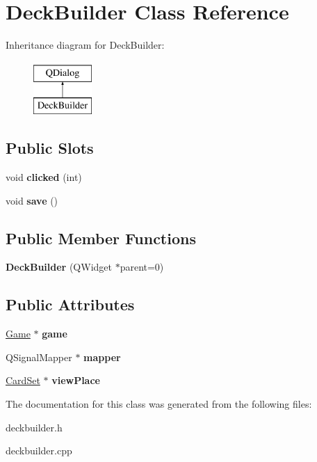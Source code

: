 \hypertarget{class_deck_builder}{}\section{Deck\+Builder Class Reference}
\label{class_deck_builder}
Inheritance diagram for Deck\+Builder\+:\begin{figure}[H]
\begin{center}
\leavevmode
\includegraphics[height=2.000000cm]{class_deck_builder}
\end{center}
\end{figure}
\subsection*{Public Slots}
\begin{DoxyCompactItemize}
\item 
\mbox{\label{class_deck_builder_a4f6b854f2e899978cfee769b60d4e383}} 
void {\bfseries clicked} (int)
\item 
\mbox{\label{class_deck_builder_a53e4027ab59c876b6c5b55be2b6abdf7}} 
void {\bfseries save} ()
\end{DoxyCompactItemize}
\subsection*{Public Member Functions}
\begin{DoxyCompactItemize}
\item 
\mbox{\label{class_deck_builder_a27ddaae932ced02f22e26444ca391909}} 
{\bfseries Deck\+Builder} (Q\+Widget $\ast$parent=0)
\end{DoxyCompactItemize}
\subsection*{Public Attributes}
\begin{DoxyCompactItemize}
\item 
\mbox{\label{class_deck_builder_ae111e9bac35ec1c2140a50a6308c55ac}} 
\hyperlink{class_game}{Game} $\ast$ {\bfseries game}
\item 
\mbox{\label{class_deck_builder_a1d73429e77634d8a4698f9a86e1b9aed}} 
Q\+Signal\+Mapper $\ast$ {\bfseries mapper}
\item 
\mbox{\label{class_deck_builder_aa7d6acc263ed5f017189614d4650e2aa}} 
\hyperlink{class_card_set}{Card\+Set} $\ast$ {\bfseries view\+Place}
\end{DoxyCompactItemize}


The documentation for this class was generated from the following files\+:\begin{DoxyCompactItemize}
\item 
deckbuilder.\+h\item 
deckbuilder.\+cpp\end{DoxyCompactItemize}
